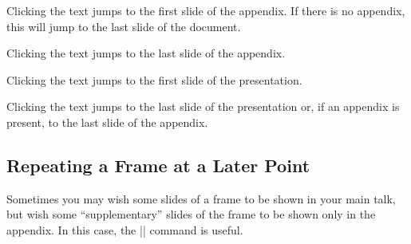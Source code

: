 \begin{command}{\hyperlinkappendixstart{}}
  Clicking the text jumps to the first slide of the appendix. If there is no appendix, this will jump to the last slide of the document.
\end{command}

\begin{command}{\hyperlinkappendixend{}}
  Clicking the text jumps to the last slide of the appendix.
\end{command}

\begin{command}{\hyperlinkdocumentstart{}}
  Clicking the text jumps to the first slide of the presentation.
\end{command}

\begin{command}{\hyperlinkdocumentend{}}
  Clicking the text jumps to the last slide of the presentation or, if an appendix is present, to the last slide of the appendix.
\end{command}


\subsection{Repeating a Frame at a Later Point}

Sometimes you may wish some slides of a frame to be shown in your main talk, but wish some ``supplementary'' slides of the frame to be shown only in the appendix. In this case, the |\againframe| command is useful.


